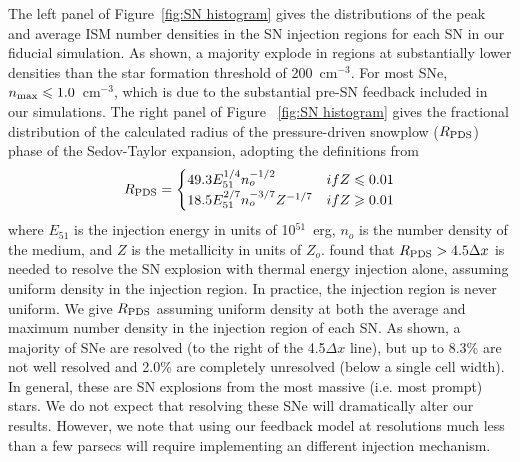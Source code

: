 \documentclass[fleqn,usenatbib,useAMS]{mnras}
\begin{document}
The left panel of Figure~\ref{fig:SN histogram} gives the distributions of the peak and average ISM number densities in the SN injection regions for each SN in our fiducial simulation. As shown, a majority explode in regions at substantially lower densities than the star formation threshold of 200~cm$^{-3}$. For most SNe, $n_{\rm max} \le 1.0$~cm$^{-3}$, which is due to the substantial pre-SN feedback included in our simulations. The right panel of Figure ~\ref{fig:SN histogram} gives the fractional distribution of the calculated radius of the pressure-driven snowplow ($R_{\rm PDS}$) phase of the Sedov-Taylor expansion, adopting the definitions from \citet{Simpson2016}
\begin{equation}
R_{\rm PDS} = 
\begin{cases}
49.3E^{1/4}_{51}n^{-1/2}_{o} & if  Z \le 0.01 \\
18.5E^{2/7}_{51}n^{-3/7}_{o}Z^{-1/7} & if  Z \ge 0.01 \\
\end{cases}
\end{equation}
where $E_{51}$ is the injection energy in units of 10$^{51}$~erg, $n_{o}$ is the number density of the medium, and $Z$ is the metallicity in units of $Z_{o}$. \citet{Simpson2016} found that $R_{\rm PDS} > 4.5 \Delta x$ is needed to resolve the SN explosion with thermal energy injection alone, assuming uniform density in the injection region. In practice, the injection region is never uniform. We give $R_{\rm PDS}$ assuming uniform density at both the average and maximum number density in the injection region of each SN. As shown, a majority of SNe are resolved (to the right of the 4.5$\Delta x$ line), but up to 8.3\% are not well resolved and 2.0\% are completely unresolved (below a single cell width). In general, these are SN explosions from the most massive (i.e. most prompt) stars. We do not expect that resolving these SNe will dramatically alter our results. However, we note that using our feedback model at resolutions much less than a few parsecs will require implementing an different injection mechanism.
\end{document}
